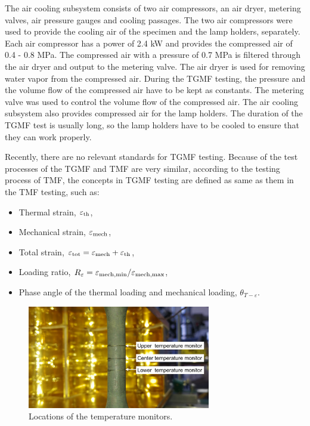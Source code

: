 \documentclass[preprint,5p,twocolumn,11pt,sort&compress]{elsarticle}
\begin{document}
The air cooling subsystem consists of two air compressors, an air dryer, metering valves, air pressure gauges and cooling passages. 
The two air compressors were used to provide the cooling air of the specimen and the lamp holders, separately.
Each air compressor has a power of 2.4 kW and provides the compressed air of 0.4 - 0.8 MPa. The compressed air with a pressure of 0.7 MPa is filtered through the air dryer and output to the metering valve. The air dryer is used for removing water vapor from the compressed air.
During the TGMF testing, the pressure and the volume flow of the compressed air have to be kept as constants. The metering valve was used to control the volume flow of the compressed air.
The air cooling subsystem also provides compressed air for the lamp holders.
The duration of the TGMF test is usually long, so the lamp holders have to be cooled to ensure that they can work properly.




Recently, there are no relevant standards for TGMF testing. Because of the test processes of the TGMF and TMF are very similar, according to the testing process of TMF, the concepts in TGMF testing are defined as same as them in the TMF testing, such as:
\begin{itemize}
  \item {Thermal strain}, $\varepsilon_{\rm{th}}$,
  \item {Mechanical strain}, $\varepsilon_{\rm{mech}}$,
  \item {Total strain}, $\varepsilon_{\rm{tot}}=\varepsilon_{\rm{mech}}+\varepsilon_{\rm{th}}$,
  \item {Loading ratio}, $R_{\varepsilon}=\varepsilon_{\rm{mech,min}}/\varepsilon_{\rm{mech,max}}$,
  \item {Phase angle of the thermal loading and mechanical loading}, $\theta_{T-\varepsilon}$.
\end{itemize}



\begin{figure}[!htp]
	\centering
	\includegraphics[width=8.0cm]{temperature_monitors_tgmf.pdf}
	\caption{Locations of the temperature monitors.}
	\label{Fig:temperature_monitors_tgmf}
\end{figure}
\end{document}
